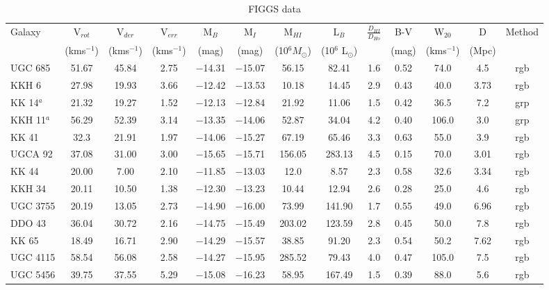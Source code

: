 \documentclass[useAMS,usenatbib]{mn2e}
\begin{document}
\begin{table}
\caption{FIGGS data}
\label{tab:data}
\begin{tabular}{|l|c|c|c|c|c|c|c|c|c|c|c|c|}
\hline
Galaxy &
V$_{rot}$ &
  \multicolumn{1}{c|}{V$_{der}$} &
  \multicolumn{1}{c|}{V$_{err}$} &
  \multicolumn{1}{c|}{M$_B$} &
  \multicolumn{1}{c|}{M$_I$} &
  \multicolumn{1}{c|}{M$_{HI}$} &
  \multicolumn{1}{c|}{L$_B$} &
  \multicolumn{1}{c|}{$\frac{D_{HI}}{D_{Ho}}$} &
  \multicolumn{1}{c|}{B-V} &
  \multicolumn{1}{c|}{W$_{20}$}& 
D &
Method\\
& (kms$^{-1}$)&(kms$^{-1}$)&(kms$^{-1}$)&(mag)&(mag)&(10$^6 M_\odot$)&(10$^6$ L$_\odot$)&&(mag)&(kms$^{-1}$) &(Mpc)&\\
\hline
  UGC 685      & 51.67 & 45.84 & 2.75 & $-$14.31 & $-$15.07 & 56.15  & 82.41 &  1.6 & 0.52 & 74.0 & 4.5 &rgb\\
  KKH 6        & 27.98 & 19.93 & 3.66 & $-$12.42 & $-$13.53 & 10.18  & 14.45 &  2.9 & 0.43 & 40.0 & 3.73&rgb\\
  KK 14$^a$    & 21.32 & 19.27 & 1.52 & $-$12.13 & $-$12.84 & 21.92  & 11.06 &  1.5 & 0.42 & 36.5 & 7.2 & grp\\
  KKH 11$^a$   & 56.29 & 52.39 & 3.14 & $-$13.35 & $-$14.06 & 52.87  & 34.04 &  4.2 & 0.40 & 106.0& 3.0 & grp\\
  KK 41        & 32.3  & 21.91 & 1.97 & $-$14.06 & $-$15.27 & 67.19  & 65.46 &  3.3 & 0.63 & 55.0 & 3.9 &rgb\\
  UGCA 92      & 37.08 & 31.00 & 3.00 & $-$15.65 & $-$15.71 & 156.05 & 283.13&  4.5 & 0.15 & 70.0 & 3.01&rgb\\
  KK 44        & 20.00 & 7.00  & 2.10 & $-$11.85 & $-$13.03 & 12.0   & 8.57  &  2.3 & 0.58 & 32.6 & 3.34&rgb\\
  KKH 34       & 20.11 & 10.50 & 1.38 & $-$12.30 & $-$13.23 & 10.44  & 12.94 &  2.6 & 0.28 & 25.0 & 4.6 &rgb\\
  UGC 3755     & 20.19 & 13.05 & 2.73 & $-$14.90 & $-$16.00 & 73.99  & 141.90& 1.7  & 0.55 & 49.0 & 6.96&rgb\\
  DDO 43       & 36.04 & 30.72 & 2.16 & $-$14.75 & $-$15.49 & 203.02 & 123.59&  2.8 & 0.45 & 50.0 & 7.8 &rgb\\
  KK 65        & 18.49 & 16.71 & 2.90 & $-$14.29 & $-$15.57 & 38.85  & 91.20 &  2.3 & 0.54 & 50.2 & 7.62&rgb\\
  UGC 4115     & 58.54 & 56.08 & 2.58 & $-$14.27 & $-$15.95 & 285.52 & 79.43 & 4.0  & 0.47 & 105.0&7.5  &rgb\\
  UGC 5456     & 39.75 & 37.55 & 5.29 & $-$15.08 & $-$16.23 & 58.95  & 167.49& 1.5  & 0.39 & 88.0 & 5.6 &rgb\\

\end{tabular}
\end{table}
\end{document}
